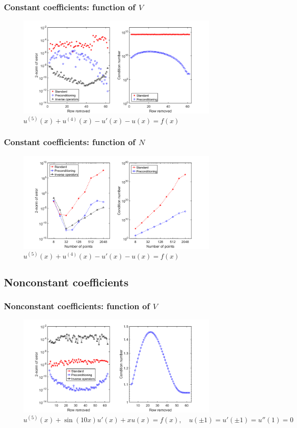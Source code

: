 \documentclass[handout]{beamer}
\begin{document}
\begin{frame}
\frametitle{Constant coefficients: function of $V$}
\begin{figure}
\includegraphics[width=0.9\textwidth]{example_5thCC_V.png}
\caption{$u^{(5)}(x) + u^{(4)}(x) - u'(x) - u(x) = f(x)$}
\end{figure}
\end{frame}

\begin{frame}
\frametitle{Constant coefficients: function of $N$}
\begin{figure}
\includegraphics[width=0.9\textwidth]{example_5thCC_N.png}
\caption{ $u^{(5)}(x) + u^{(4)}(x) - u'(x) - u(x) = f(x)$}
\end{figure}
\end{frame}

\subsection{Nonconstant coefficients}

\begin{frame}
\frametitle{Nonconstant coefficients: function of $V$}
\begin{figure}
\includegraphics[width=0.9\textwidth]{example_Wang5th_V64.png}
\caption{ $u^{(5)}(x) + \sin(10x) u'(x) + x u(x) = f(x), \quad u(\pm 1) = u'(\pm 1) = u''(1) = 0$}
\end{figure}
\end{frame}
\end{document}
